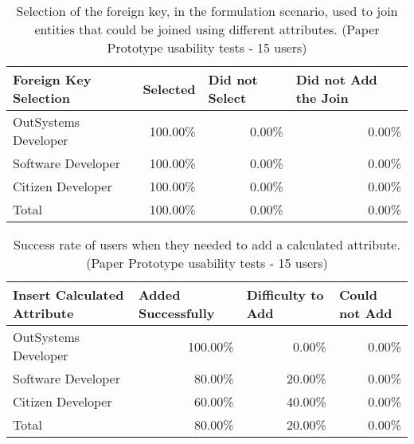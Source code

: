 \begin{table}[tb]
  \caption{Selection of the foreign key, in the formulation scenario, used to join entities that could be joined using different attributes. (Paper Prototype usability tests - 15 users)}
  \label{tab:paperPrototypeForeignKeySelection}
  \begin{tabular}{@{}lrrr@{}}
  \toprule
  \textbf{Foreign Key Selection} & \multicolumn{1}{l}{Selected} & \multicolumn{1}{l}{Did not Select} & \multicolumn{1}{l}{Did not Add the Join} \\ \midrule
  OutSystems Developer           & 100.00\%                     & 0.00\%                             & 0.00\%                                   \\
  Software Developer             & 100.00\%                     & 0.00\%                             & 0.00\%                                   \\
  Citizen Developer              & 100.00\%                     & 0.00\%                             & 0.00\%                                   \\
  Total                          & 100.00\%                     & 0.00\%                             & 0.00\%                                   \\ \bottomrule
  \end{tabular}
  \end{table}

\begin{table}[tb]
  \caption{Success rate of users when they needed to add a calculated attribute. (Paper Prototype usability tests - 15 users)}
  \label{tab:paperPrototypeCalculatedAttribute}
  \begin{tabular}{@{}m{5cm}rrr@{}}
  \toprule
  \textbf{Insert Calculated Attribute} & \multicolumn{1}{l}{Added Successfully} & \multicolumn{1}{l}{Difficulty to Add} & \multicolumn{1}{l}{Could not Add} \\ \midrule
  OutSystems Developer                 & 100.00\%                               & 0.00\%                                & 0.00\%                            \\
  Software Developer                   & 80.00\%                                & 20.00\%                               & 0.00\%                            \\
  Citizen Developer                    & 60.00\%                                & 40.00\%                               & 0.00\%                            \\
  Total                                & 80.00\%                                & 20.00\%                               & 0.00\%                            \\ \bottomrule
  \end{tabular}
  \end{table}


